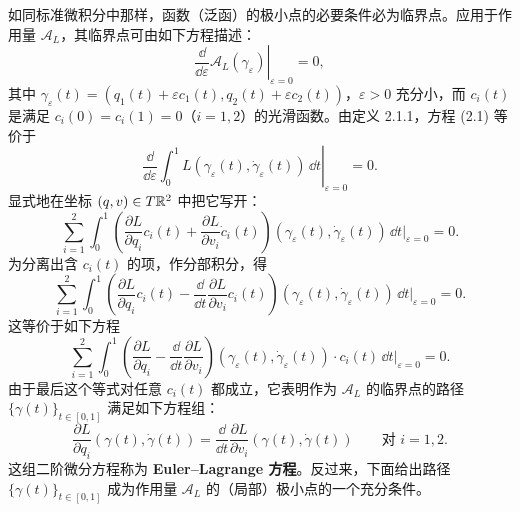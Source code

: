 如同标准微积分中那样，函数（泛函）的极小点的必要条件必为临界点。应用于作用量 $\mathcal{A}_L$，其临界点可由如下方程描述：
\begin{equation}
  \left.\frac{\dd}{\dd\varepsilon}\mathcal{A}_L(\gamma_\varepsilon)\right|_{\varepsilon=0}=0,
  \tag{2.1}
\end{equation}
其中 $\gamma_\varepsilon(t)=(q_1(t)+\varepsilon c_1(t),q_2(t)+\varepsilon c_2(t))$，$\varepsilon>0$ 充分小，而 $c_i(t)$ 是满足 $c_i(0)=c_i(1)=0$（$i=1,2$）的光滑函数。由定义 2.1.1，方程 (2.1) 等价于
\[
  \left.\frac{\dd}{\dd\varepsilon}\int_0^1L(\gamma_\varepsilon(t),\dot\gamma_\varepsilon(t))\,\dd t
  \right|_{\varepsilon=0}=0 .
\]
显式地在坐标 $(q,v)\in T\mathbb{R}^2$ 中把它写开：
\[
  \sum_{i=1}^2\int_0^1\left(\frac{\partial L}{\partial q_i}c_i(t)
  +\frac{\partial L}{\partial v_i}\dot c_i(t)\right)(\gamma_\varepsilon(t),\dot\gamma_\varepsilon(t))\,\dd t
  \bigg|_{\varepsilon=0}=0 .
\]
为分离出含 $c_i(t)$ 的项，作分部积分，得
\[
  \sum_{i=1}^2\int_0^1\left(\frac{\partial L}{\partial q_i}c_i(t)
  -\frac{\dd}{\dd t}\frac{\partial L}{\partial v_i}c_i(t)\right)(\gamma_\varepsilon(t),\dot\gamma_\varepsilon(t))\,\dd t
  \bigg|_{\varepsilon=0}=0 .
\]
这等价于如下方程
\[
  \sum_{i=1}^2\int_0^1\left(\frac{\partial L}{\partial q_i}
  -\frac{\dd}{\dd t}\frac{\partial L}{\partial v_i}\right)(\gamma_\varepsilon(t),\dot\gamma_\varepsilon(t))
  \cdot c_i(t)\,\dd t\bigg|_{\varepsilon=0}=0 .
\]
由于最后这个等式对任意 $c_i(t)$ 都成立，它表明作为 $\mathcal{A}_L$ 的临界点的路径 $\{\gamma(t)\}_{t\in[0,1]}$ 满足如下方程组：
\begin{equation}
  \frac{\partial L}{\partial q_i}(\gamma(t),\dot\gamma(t))
  =\frac{\dd}{\dd t}\frac{\partial L}{\partial v_i}(\gamma(t),\dot\gamma(t))
  \qquad\text{对 } i=1,2 .
  \tag{2.2}
\end{equation}
这组二阶微分方程称为 \textbf{Euler--Lagrange 方程}。反过来，下面给出路径 $\{\gamma(t)\}_{t\in[0,1]}$ 成为作用量 $\mathcal{A}_L$ 的（局部）极小点的一个充分条件。

